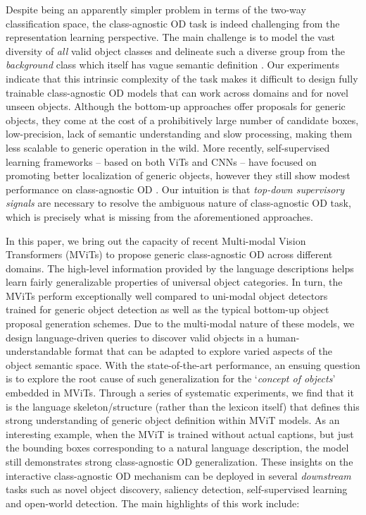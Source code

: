 \documentclass[runningheads]{llncs}
\begin{document}
Despite being an apparently simpler problem in terms of the two-way classification space, the class-agnostic OD task is indeed challenging from the representation learning perspective. The main challenge is to model the vast diversity of \emph{all} valid object classes and delineate such a diverse group from the \emph{background} class which itself has vague semantic definition \cite{alexe2012measuring}. Our experiments indicate that this intrinsic complexity of the task makes it difficult to design fully trainable class-agnostic OD models that can work across domains and for novel unseen objects. Although the bottom-up approaches offer proposals for generic objects, they come at the cost of a prohibitively large number of candidate boxes, low-precision, lack of semantic understanding and slow processing, making them less scalable to generic operation in the wild. More recently, self-supervised learning frameworks -- based on both ViTs \cite{detreg,dai2021up} and CNNs \cite{xie2021detco,xiao2021region} -- have focused on promoting better localization of generic objects, however they still show modest performance on class-agnostic OD \cite{detreg}. Our intuition is that \emph{top-down supervisory signals} are necessary to resolve the ambiguous nature of class-agnostic OD task, which is precisely what is missing from the aforementioned approaches. 

In this paper, we bring out the capacity of recent Multi-modal Vision Transformers (MViTs) to propose generic class-agnostic OD across different domains. The high-level information provided by the language descriptions helps learn fairly generalizable properties of universal object categories. In turn, the MViTs perform exceptionally well compared to uni-modal object detectors trained for generic object detection as well as the typical bottom-up object proposal generation schemes. Due to the multi-modal nature of these models, we design language-driven queries to discover valid objects in a human-understandable format that can be adapted to explore varied aspects of the object semantic space. With the state-of-the-art performance, an ensuing question is to explore the root cause of such generalization for the `\emph{concept of objects}' embedded in MViTs. Through a series of systematic experiments, we find that it is the language skeleton/structure (rather than the lexicon itself) that defines this strong understanding of generic object definition within MViT models. As an interesting example, when the MViT is trained without actual captions, but just the bounding boxes corresponding to a natural language description, the model still demonstrates strong class-agnostic OD generalization. These insights on the interactive class-agnostic OD mechanism can be deployed in several \emph{downstream} tasks such as novel object discovery, saliency detection, self-supervised learning and open-world detection. The main highlights of this work include:
\end{document}
